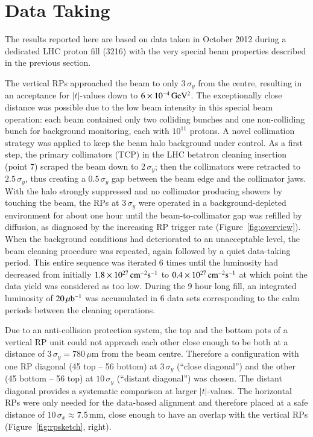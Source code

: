 \section{Data Taking}
\label{sec:data taking}

The results reported here are based on data taken in October 2012 
during a dedicated LHC proton fill (3216)
with the very special beam properties described in the previous section.

The vertical RPs approached the beam to only $3\,\sigma_{y}$ from the centre, resulting in an acceptance for $|t|$-values down to $6 \times 10^{-4}\,\rm GeV^{2}$. The exceptionally close distance was possible due to the low beam intensity in this special beam operation: each beam contained only two colliding bunches and one non-colliding bunch for background monitoring, each with $10^{11}$ protons. A novel collimation strategy was applied to keep the beam halo background under control. As a first step, the primary 
collimators (TCP) in the LHC betatron cleaning insertion (point 7) scraped the beam down to $2\,\sigma_{y}$; then the collimators were retracted to $2.5\,\sigma_{y}$, thus creating a $0.5\,\sigma_{y}$ gap between
the beam edge and the collimator jaws. With the halo strongly suppressed 
and no collimator producing showers by touching the beam, the RPs at 
$3\,\sigma_{y}$ were operated in a background-depleted environment for about one 
hour until the beam-to-collimator gap was refilled by diffusion, as 
diagnosed by the increasing RP trigger rate (Figure~\ref{fig:overview}). When the background conditions
had deteriorated to an unacceptable level, the beam cleaning procedure was repeated, again followed by a quiet data-taking period.
This entire sequence was iterated 6 times until the luminosity had decreased 
from initially $1.8\times10^{27}\,\rm cm^{-2}s^{-1}$ to 
$0.4\times10^{27}\,\rm cm^{-2}s^{-1}$
at which point the data yield was considered as too low. 
During the 9 hour long fill, an integrated luminosity of $20\,\rm \mu b^{-1}$ 
was accumulated in 6 data sets corresponding to the calm periods 
between the cleaning operations. 

Due to an anti-collision protection system, the top and the bottom pots of a 
vertical RP unit could not approach each other close enough to be both at a 
distance of $3\,\sigma_{y} = 780\,\mu$m from the beam centre. Therefore a 
configuration with one RP diagonal (45 top -- 56 bottom) at $3\,\sigma_{y}$ (``close diagonal'') and the other (45 bottom -- 56 top) at 
$10\,\sigma_{y}$ (``distant diagonal'') was chosen. The distant diagonal provides a systematic comparison at larger $|t|$-values.
The horizontal RPs were only needed for the data-based alignment and therefore placed at a safe distance of $10\,\sigma_{x} \approx 7.5$\,mm, close enough to have an overlap with the vertical RPs (Figure~\ref{fig:rpsketch}, right).


